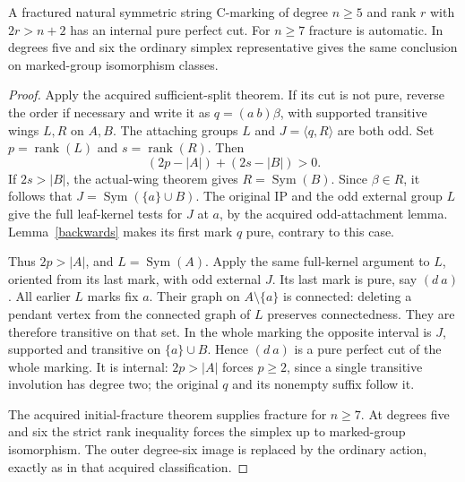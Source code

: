 \documentclass[11pt,a4paper]{article}
\newcommand{\gen}[1]{\langle#1\rangle}
\newcommand{\Sym}{\operatorname{Sym}}
\begin{document}
\begin{theorem}\label{exist}
A fractured natural symmetric string C-marking of degree $n\ge5$ and
rank $r$ with $2r>n+2$ has an internal pure perfect cut. For $n\ge7$
fracture is automatic. In degrees five and six the ordinary simplex
representative gives the same conclusion on marked-group isomorphism
classes.
\end{theorem}
\begin{proof}
Apply the acquired sufficient-split theorem. If its cut is not pure,
reverse the order if necessary and write it as
$q=(a\ b)\beta$, with supported transitive wings $L,R$ on $A,B$.
The attaching groups $L$ and $J=\gen{q,R}$ are both odd. Set
$p=\operatorname{rank}(L)$ and $s=\operatorname{rank}(R)$. Then
\[
                    (2p-|A|)+(2s-|B|)>0.                \tag{1}
\]
If $2s>|B|$, the actual-wing theorem gives $R=\Sym(B)$.
Since $\beta\in R$, it follows that $J=\Sym(\{a\}\cup B)$.
The original IP and the odd external group $L$ give the full
leaf-kernel tests for $J$ at $a$, by the acquired odd-attachment
lemma. Lemma~\ref{backwards} makes its first mark $q$ pure,
contrary to this case.

Thus $2p>|A|$, and $L=\Sym(A)$. Apply the same full-kernel
argument to $L$, oriented from its last mark, with odd external
$J$. Its last mark is pure, say $(d\ a)$. All earlier $L$ marks
fix $a$. Their graph on $A\setminus\{a\}$ is connected: deleting
a pendant vertex from the connected graph of $L$ preserves
connectedness. They are therefore transitive on that set. In the
whole marking the opposite interval is $J$, supported and transitive
on $\{a\}\cup B$. Hence $(d\ a)$ is a pure perfect cut of the
whole marking. It is internal: $2p>|A|$ forces $p\ge2$, since a
single transitive involution has degree two; the original $q$ and
its nonempty suffix follow it.

The acquired initial-fracture theorem supplies fracture for $n\ge7$.
At degrees five and six the strict rank inequality forces the simplex
up to marked-group isomorphism. The outer degree-six image is replaced
by the ordinary action, exactly as in that acquired classification.
\end{proof}
\end{document}
